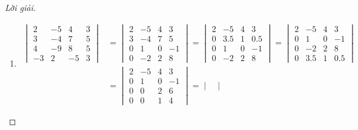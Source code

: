 \begin{proof}[Lời giải]
    \begin{enumerate}[label = (\alph*)]
        \item
              \begin{align*}
                  \begin{vmatrix}
                      2  & -5 & 4  & 3 \\
                      3  & -4 & 7  & 5 \\
                      4  & -9 & 8  & 5 \\
                      -3 & 2  & -5 & 3
                  \end{vmatrix}
                   & =
                  \begin{vmatrix}
                      2 & -5 & 4 & 3  \\
                      3 & -4 & 7 & 5  \\
                      0 & 1  & 0 & -1 \\
                      0 & -2 & 2 & 8
                  \end{vmatrix}
                  =
                  \begin{vmatrix}
                      2 & -5  & 4 & 3   \\
                      0 & 3.5 & 1 & 0.5 \\
                      0 & 1   & 0 & -1  \\
                      0 & -2  & 2 & 8
                  \end{vmatrix}
                  =
                  \begin{vmatrix}
                      2 & -5  & 4 & 3   \\
                      0 & 1   & 0 & -1  \\
                      0 & -2  & 2 & 8   \\
                      0 & 3.5 & 1 & 0.5
                  \end{vmatrix} \\
                   & =
                  \begin{vmatrix}
                      2 & -5 & 4 & 3  \\
                      0 & 1  & 0 & -1 \\
                      0 & 0  & 2 & 6  \\
                      0 & 0  & 1 & 4
                  \end{vmatrix}
                  =
                  \begin{vmatrix}

\end{vmatrix}
\end{align*}
\end{enumerate}
\end{proof}
